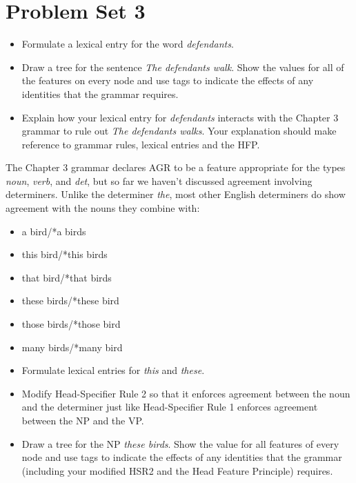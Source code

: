 \documentclass[a4paper,landscape,headrule,footrule]{foils}
\begin{document}
\section{Problem Set 3}

\begin{itemize}
\item[A.] Formulate  a  lexical entry for the word {\it defendants}.
\item[B.] Draw a tree for the sentence {\it The defendants walk}.  Show
the values for all of the features on every node and use tags to indicate
the effects of any identities that the %
grammar requires.
\item[C.] Explain how your lexical entry for {\it defendants} interacts
with the Chapter 3 grammar to rule out {\it *The defendants walks}.
Your explanation should make reference to grammar rules, lexical
entries and the HFP. 
\end{itemize}


The Chapter 3 grammar declares AGR to be a feature
appropriate for the types {\it noun}, {\it verb}, and {\it det}, but
so far we haven't discussed agreement involving determiners.  Unlike
the determiner {\it the}, most other English determiners do show
agreement with the nouns they combine with:

\begin{itemize}\addtolength{\itemsep}{-1ex}
\item[(i)] a bird/*a birds
\item[(ii)] this bird/*this birds
\item[(iii)] that bird/*that birds
\item[(iv)] these birds/*these bird
\item[(v)] those birds/*those bird
\item[(vi)] many birds/*many bird
\end{itemize}
\newpage

\begin{itemize}
\item[A.] Formulate lexical entries for {\it this} and {\it these}.
\item[B.] Modify Head-Specifier Rule 2 so that it enforces agreement
between the noun and the determiner just like Head-Specifier Rule 1
enforces agreement between the NP and the VP.
\item[C.] Draw a tree for the NP {\it these birds}. Show the
value for all features of every node and use tags to indicate the
effects of any identities that the %
grammar 
(including your modified
HSR2 and the Head Feature Principle) requires.
\end{itemize}
\end{document}
